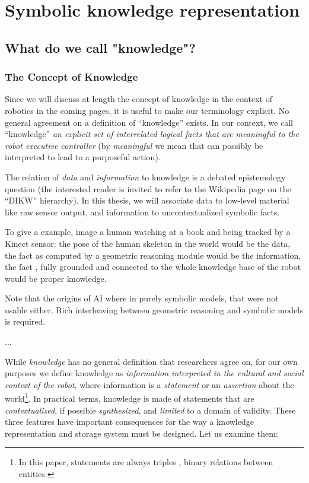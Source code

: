 \chapter{Symbolic knowledge representation}
\label{chapt|krs}


\section{What do we call "knowledge"?}
\label{sect|on-knowledge}

\subsection{The Concept of Knowledge}
\label{sect|knowledge}


Since we will discuss at length the concept of knowledge in the context
of robotics in the coming pages, it is useful to make our terminology explicit.  No general
agreement on a definition of ``knowledge'' exists. In our context, we call
``knowledge'' \emph{an explicit set of interrelated logical facts that are
meaningful to the robot executive controller} (by \emph{meaningful} we mean
that can possibly be interpreted to lead to a purposeful action).

The relation of \emph{data} and \emph{information} to knowledge is a debated
epistemology question (the interested reader is invited to refer to the
Wikipedia page on the ``DIKW'' hierarchy). In this thesis, we will associate
data to low-level material like raw sensor output, and information to
uncontextualized symbolic facts.

To give a example, image a human watching at a book and being tracked by a
Kinect sensor: the pose of the human skeleton in the world would be the data,
the fact  as computed by a geometric reasoning
module would be the information, the fact , fully grounded and connected to the whole knowledge base of
the robot would be proper knowledge.

Note that the origins of AI where in purely symbolic models, that were
not usable either. Rich interleaving between geometric reasoning and symbolic
models is required.

...

While \emph{knowledge} has no general definition that researchers agree on, for
our own purposes we define knowledge as \emph{information interpreted in the
cultural and social context of the robot}, where information is a
\emph{statement} or an \emph{assertion} about the world\footnote{In this paper,
statements are always triples , \ie binary
relations between entities.}. In practical terms, knowledge is made of
statements that are \emph{contextualized}, if possible \emph{synthesized}, and
\emph{limited} to a domain of validity. These three features have important 
consequences for the way a knowledge representation and storage system must 
be designed. Let us examine them:

